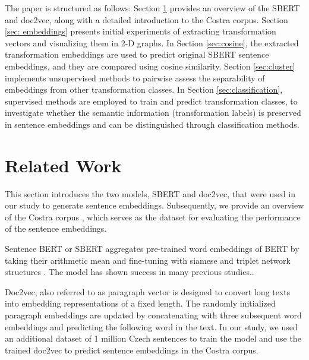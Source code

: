 \documentclass[11pt]{article}
\begin{document}
The paper is structured as follows: Section \ref{sec:related work} provides an overview of the SBERT and doc2vec, along with a detailed introduction to the Costra corpus. Section \ref{sec: embeddings} presents initial experiments of extracting transformation vectors and visualizing them in 2-D graphs. In Section \ref{sec:cosine}, the extracted transformation embeddings are used to predict original SBERT sentence embeddings, and they are compared using cosine similarity. Section \ref{sec:cluster} implements unsupervised methods to pairwise assess the separability of embeddings from other transformation classes. In Section \ref{sec:classification}, supervised methods are employed to train and predict transformation classes, to investigate whether the semantic information (transformation labels) is preserved in sentence embeddings and can be distinguished through classification methods.


\section{Related Work} \label{sec:related work}

This section introduces the two models, SBERT and doc2vec, that were used in our study to generate sentence embeddings. Subsequently, we provide an overview of the Costra corpus \cite{baranvcikova2020costra}, which serves as the dataset for evaluating the performance of the sentence embeddings.

Sentence BERT or SBERT \cite{reimers2019sentence} aggregates pre-trained word embeddings of BERT \cite{devlin-etal-2019-bert} by taking their arithmetic mean and fine-tuning with siamese and triplet network structures \cite{reimers2019sentence}. The model has shown success in many previous studies.\cite{opitz-frank-2022-sbert,9140343}.

Doc2vec, also referred to as paragraph vector \cite{le2014distributed} is designed to convert long texts into embedding representations of a fixed length. The randomly initialized paragraph embeddings are updated by concatenating with three subsequent word embeddings and predicting the following word in the text. In our study, we used an additional dataset of 1 million Czech sentences to train the model and use the trained doc2vec to predict sentence embeddings in the Costra corpus.



\end{document}
